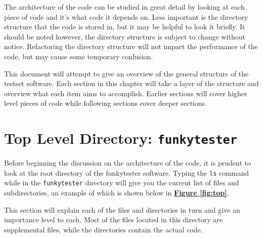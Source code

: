 \documentclass{report}
\begin{document}
	The architecture of the code can be studied in great detail by looking at each piece of code and it's what code it depends on. Less important is the directory structure that the code is stored in, but it may be helpful to look it briefly. It should be noted however, the directory structure is subject to change without notice. Refactoring the directory structure will not impact the performance of the code, but may cause some temporary confusion.
	
	This document will attempt to give an overview of the general structure of the testset software. Each section in this chapter will take a layer of the structure and overview what each item aims to accomplish. Earlier sections will cover higher level pieces of code while following sections cover deeper sections.
	
\section{Top Level Directory: \texttt{funkytester}}
Before beginning the discussion on the architecture of the code, it is prudent to look at the root directory of the funkytester software. Typing the \texttt{ls} command while in the \texttt{funkytester} directory will give you the current list of files and subdirectories, an example of which is shown below in \hyperref[fig:top]{\textbf{Figure \ref{fig:top}}}.\\
	
	\begin{minipage}{\linewidth}
		\label{fig:top}
	\end{minipage} 
\vspace{5pt}%


This section will explain each of the files and directories in turn and give an importance level to each. Most of the files located in this directory are supplemental files, while the directories contain the actual code.
\end{document}
